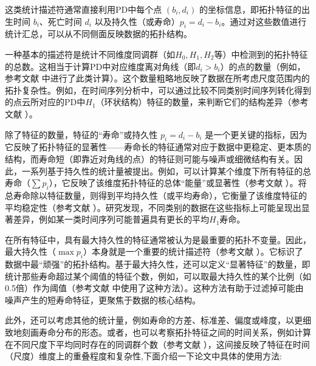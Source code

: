            这类统计描述符通常直接利用PD中每个点 $(b_i, d_i)$ 的坐标信息，即拓扑特征的出生时间 $b_i$、死亡时间 $d_i$ 以及持久性（或寿命）$p_i = d_i - b_i$。通过对这些数值进行统计汇总，可以从不同侧面反映数据的拓扑结构。
            
            一种基本的描述符是统计不同维度同调群（如$H_0, H_1, H_2$等）中检测到的拓扑特征的总数。这相当于计算PD中对应维度离对角线（即$d_i > b_i$）的点的数量（例如，参考文献  中进行了此类计算）。这个数量粗略地反映了数据在所考虑尺度范围内的拓扑复杂性。例如，在时间序列分析中，可以通过比较不同类别时间序列转化得到的点云所对应的PD中$H_1$（环状结构）特征的数量，来判断它们的结构差异（参考文献 ）。
            
            除了特征的数量，特征的“寿命”或持久性 $p_i = d_i - b_i$ 是一个更关键的指标，因为它反映了拓扑特征的显著性——寿命长的特征通常对应于数据中更稳定、更本质的结构，而寿命短（即靠近对角线的点）的特征则可能与噪声或细微结构有关。因此，一系列基于持久性的统计量被提出。例如，可以计算某个维度下所有特征的总寿命（$\sum p_i$），它反映了该维度拓扑特征的总体“能量”或显著性（参考文献 ）。将总寿命除以特征数量，则得到平均持久性（或平均寿命），它衡量了该维度特征的平均稳定性（参考文献 ）。研究发现，不同类别的数据在这些指标上可能呈现出显著差异，例如某一类时间序列可能普遍具有更长的平均$H_1$寿命。
            
            在所有特征中，具有最大持久性的特征通常被认为是最重要的拓扑不变量。因此，最大持久性（$\max p_i$）本身就是一个重要的统计描述符（参考文献 ）。它标识了数据中最“顽强”的拓扑结构。基于最大持久性，还可以定义“显著特征”的数量，即统计那些寿命超过某个阈值的特征个数，例如，可以取最大持久性的某个比例（如0.5倍）作为阈值（参考文献  中使用了这种方法）。这种方法有助于过滤掉可能由噪声产生的短寿命特征，更聚焦于数据的核心结构。
            

            
            此外，还可以考虑其他的统计量，例如寿命的方差、标准差、偏度或峰度，以更细致地刻画寿命分布的形态。或者，也可以考察拓扑特征之间的时间关系，例如计算在不同尺度下平均同时存在的同调群个数（参考文献 ），这间接反映了特征在时间（尺度）维度上的重叠程度和复杂性,下面介绍一下论文中具体的使用方法:

